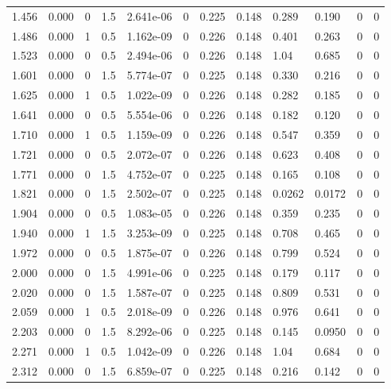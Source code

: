 \documentclass[preview]{standalone}
\begin{document}
{{\begin{tabular}{L{1.2cm}C{1.2cm} C{0.3cm}C{0.5cm} C{1.4cm}C{1.4cm} C{1.4cm}C{1.4cm} C{1.6cm}C{1.6cm} C{1.6cm}C{1.6cm}}
  1.456  &  0.000  & 0     & 1.5 &  2.641e-06  & 0  &  0.225&   0.148& 0.289 & 0.190   &  0 & 0  \\ 
  1.486  &  0.000  & 1     & 0.5 &  1.162e-09  & 0  &  0.226&   0.148& 0.401 & 0.263   &  0 & 0  \\ 
  1.523  &  0.000  & 0     & 0.5 &  2.494e-06  & 0  &  0.226&   0.148& 1.04 & 0.685   &  0 & 0  \\ 
  1.601  &  0.000  & 0     & 1.5 &  5.774e-07  & 0  &  0.225&   0.148& 0.330 & 0.216   &  0 & 0  \\ 
  1.625  &  0.000  & 1     & 0.5 &  1.022e-09  & 0  &  0.226&   0.148& 0.282 & 0.185   &  0 & 0  \\ 
  1.641  &  0.000  & 0     & 0.5 &  5.554e-06  & 0  &  0.226&   0.148& 0.182 & 0.120   &  0 & 0  \\ 
  1.710  &  0.000  & 1     & 0.5 &  1.159e-09  & 0  &  0.226&   0.148& 0.547 & 0.359   &  0 & 0  \\ 
  1.721  &  0.000  & 0     & 0.5 &  2.072e-07  & 0  &  0.226&   0.148& 0.623 & 0.408   &  0 & 0  \\ 
  1.771  &  0.000  & 0     & 1.5 &  4.752e-07  & 0  &  0.225&   0.148& 0.165 & 0.108   &  0 & 0  \\ 
  1.821  &  0.000  & 0     & 1.5 &  2.502e-07  & 0  &  0.225&   0.148& 0.0262 & 0.0172   &  0 & 0  \\ 
  1.904  &  0.000  & 0     & 0.5 &  1.083e-05  & 0  &  0.226&   0.148& 0.359 & 0.235   &  0 & 0  \\ 
  1.940  &  0.000  & 1     & 1.5 &  3.253e-09  & 0  &  0.225&   0.148& 0.708 & 0.465   &  0 & 0  \\ 
  1.972  &  0.000  & 0     & 0.5 &  1.875e-07  & 0  &  0.226&   0.148& 0.799 & 0.524   &  0 & 0  \\ 
  2.000  &  0.000  & 0     & 1.5 &  4.991e-06  & 0  &  0.225&   0.148& 0.179 & 0.117   &  0 & 0  \\ 
  2.020  &  0.000  & 0     & 1.5 &  1.587e-07  & 0  &  0.225&   0.148& 0.809 & 0.531   &  0 & 0  \\ 
  2.059  &  0.000  & 1     & 0.5 &  2.018e-09  & 0  &  0.226&   0.148& 0.976 & 0.641   &  0 & 0  \\ 
  2.203  &  0.000  & 0     & 1.5 &  8.292e-06  & 0  &  0.225&   0.148& 0.145 & 0.0950   &  0 & 0  \\ 
  2.271  &  0.000  & 1     & 0.5 &  1.042e-09  & 0  &  0.226&   0.148& 1.04 & 0.684   &  0 & 0  \\ 
  2.312  &  0.000  & 0     & 1.5 &  6.859e-07  & 0  &  0.225&   0.148& 0.216 & 0.142   &  0 & 0  \\ 

\end{tabular}}}
\end{document}
